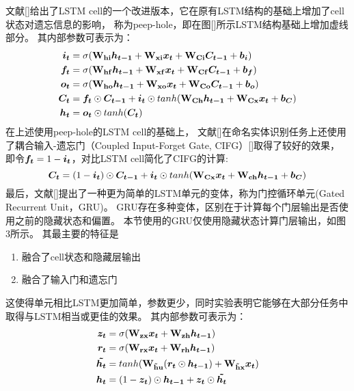 文献[]给出了LSTM cell的一个改进版本，它在原有LSTM结构的基础上增加了cell状态对遗忘信息的影响，
称为peep-hole，即在图[]所示LSTM结构基础上增加虚线部分。
其内部参数可表示为：
\begin{align*}
    \boldsymbol{i_t} &= \sigma(\boldsymbol{\mathbf{W_{hi}}}\boldsymbol{h_{t-1}} + \boldsymbol{\mathbf{W_{xi}}}\boldsymbol{x_{t}} + \boldsymbol{\mathbf{W_{Ci}}}\boldsymbol{C_{t-1}} + \boldsymbol{b_i})\\
    \boldsymbol{f_t} &= \sigma(\boldsymbol{\mathbf{W_{hf}}}\boldsymbol{h_{t-1}} + \boldsymbol{\mathbf{W_{xf}}}\boldsymbol{x_{t}} + \boldsymbol{\mathbf{W_{Cf}}}\boldsymbol{C_{t-1}} + \boldsymbol{b_f})\\
    \boldsymbol{o_t} &= \sigma(\boldsymbol{\mathbf{W_{ho}}}\boldsymbol{h_{t-1}} + \boldsymbol{\mathbf{W_{xo}}}\boldsymbol{x_{t}} + \boldsymbol{\mathbf{W_{Co}}}\boldsymbol{C_{t-1}} + \boldsymbol{b_o})\\
    \boldsymbol{C_t} &= \boldsymbol{f_t}\odot\boldsymbol{C_{t-1}} + \boldsymbol{i_t}\odot tanh(\boldsymbol{\mathbf{W_{Ch}}}\boldsymbol{h_{t-1}} + \boldsymbol{\mathbf{W_{Cx}}}\boldsymbol{x_t} + \boldsymbol{b_{C}})\\
    \boldsymbol{h_t} &= \boldsymbol{o_t} \odot tanh(\boldsymbol{C_t})
\end{align*}
在上述使用peep-hole的LSTM cell的基础上，
文献[]在命名实体识别任务上还使用了耦合输入-遗忘门（Coupled Input-Forget Gate, CIFG）[]取得了较好的效果，
即令$\boldsymbol{f_t} = 1 - \boldsymbol{i_t}$，对比LSTM cell简化了CIFG的计算:
\begin{equation*}
    \boldsymbol{C_t} = (1 - \boldsymbol{i_t})\odot \boldsymbol{C_{t-1}} + \boldsymbol{i_t}\odot tanh(\boldsymbol{\mathbf{W_{Cx}}}\boldsymbol{x_t} + \boldsymbol{\mathbf{W_{ch}}}\boldsymbol{h_{t-1}} + \boldsymbol{b_C})
\end{equation*}
最后，文献[]提出了一种更为简单的LSTM单元的变体，称为门控循环单元(Gated Recurrent Unit，GRU)。
GRU存在多种变体，区别在于计算每个门层输出是否使用之前的隐藏状态和偏置。
本节使用的GRU仅使用隐藏状态计算门层输出，如图3所示。
其最主要的特征是
\begin{enumerate}
    \item 融合了cell状态和隐藏层输出
    \item 融合了输入门和遗忘门
\end{enumerate}
这使得单元相比LSTM更加简单，参数更少，同时实验表明它能够在大部分任务中取得与LSTM相当或更佳的效果。
其内部参数可表示为：
\begin{align*}
    \boldsymbol{z_t} &= \sigma(\boldsymbol{\mathbf{W_{zx}}}\boldsymbol{x_t} + \boldsymbol{\mathbf{W_{zh}}}\boldsymbol{h_{t-1}})\\
    \boldsymbol{r_t} &= \sigma(\boldsymbol{\mathbf{W_{rx}}}\boldsymbol{x_t} + \boldsymbol{\mathbf{W_{rh}}}\boldsymbol{h_{t-1}})\\
    \boldsymbol{\tilde{h_t}} &= tanh(\boldsymbol{\mathbf{W_{\tilde{h}u}}}(\boldsymbol{r_t} \odot \boldsymbol{h_{t-1}}) + \boldsymbol{\mathbf{W_{\tilde{h}x}}}\boldsymbol{x_t})\\
    \boldsymbol{h_t} &= (1 - \boldsymbol{z_t}) \odot \boldsymbol{h_{t-1}} + \boldsymbol{z_t} \odot \boldsymbol{\tilde{h_t}}
\end{align*}

